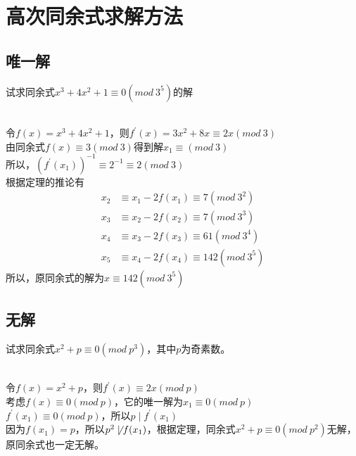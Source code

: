 \documentclass[cn,10pt]{elegantbook}
\begin{document}
\section{高次同余式求解方法}
\subsection{唯一解}
\begin{example}
  试求同余式$x^3+4x^2+1 \equiv 0(mod\ 3^5)$的解
\end{example}
\begin{solution}
  \\令$f(x) = x^3+4x^2+1$，则$f^{\prime}(x) = 3x^2+8x \equiv 2x(mod\ 3)$
  \\由同余式$f(x) \equiv 3(mod\ 3)$得到解$x_1 \equiv (mod\ 3)$
  \\所以，$(f^{\prime}(x_1))^{-1} \equiv 2^{-1} \equiv 2(mod\ 3)$
  \\根据定理的推论有
  \begin{align*}
    x_2 &\equiv x_1-2f(x_1) \equiv 7(mod\ 3^2)
    \\x_3 &\equiv x_2-2f(x_2) \equiv 7(mod\ 3^3)
    \\x_4 &\equiv x_3-2f(x_3) \equiv 61(mod\ 3^4)
    \\x_5 &\equiv x_4-2f(x_4) \equiv 142(mod\ 3^5)
  \end{align*}
  所以，原同余式的解为$x \equiv 142(mod\ 3^5)$
\end{solution}
\subsection{无解}
\begin{example}
  试求同余式$x^2+p \equiv 0(mod\ p^3)$，其中$p$为奇素数。
\end{example}
\begin{solution}
  \\令$f(x) = x^2+p$，则$f^{\prime}(x) \equiv 2x(mod\ p)$
  \\ 考虑$f(x) \equiv 0(mod\ p)$，它的唯一解为$x_1 \equiv 0(mod\ p)$
  \\$f^{\prime}(x_1) \equiv 0(mod\ p)$，所以$p \mid f^{\prime}(x_1)$
  \\因为$f(x_1) = p$，所以$p^2 \not\mid f(x_1)$，根据定理，同余式$x^2+p \equiv 0(mod\ p^2)$无解，原同余式也一定无解。
\end{solution}
\end{document}
